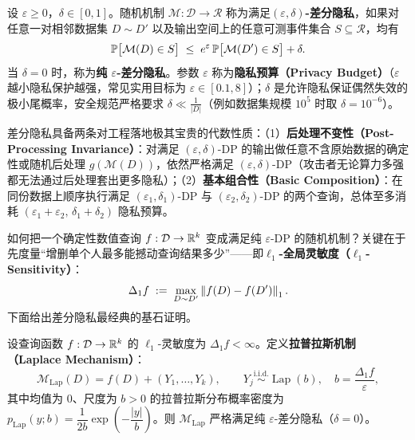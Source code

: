 \begin{defBox}
\begin{definition}\label{def:dp}
设 $\varepsilon \ge 0$，$\delta \in [0, 1]$。随机机制 $\mathcal{M}: \mathcal{D} \to \mathcal{R}$ 称为满足\textbf{$(\varepsilon, \delta)$-差分隐私}，如果对任意一对相邻数据集 $D \sim D'$ 以及输出空间上的任意可测事件集合 $S \subseteq \mathcal{R}$，均有
\begin{equation}\label{eq:dp-def}
  \mathbb{P}\big[\mathcal{M}(D) \in S\big]
  \;\le\; e^{\varepsilon}\,\mathbb{P}\big[\mathcal{M}(D') \in S\big] + \delta.
\end{equation}
当 $\delta = 0$ 时，称为\textbf{纯 $\varepsilon$-差分隐私}。参数 $\varepsilon$ 称为\textbf{隐私预算（Privacy Budget）}（$\varepsilon$ 越小隐私保护越强，常见实用目标为 $\varepsilon \in [0.1, 8]$）；$\delta$ 是允许隐私保证偶然失效的极小尾概率，安全规范严格要求 $\delta \ll \frac{1}{|D|}$（例如数据集规模 $10^5$ 时取 $\delta = 10^{-6}$）。
\end{definition}
\end{defBox}

差分隐私具备两条对工程落地极其宝贵的代数性质：（1）\textbf{后处理不变性（Post-Processing Invariance）}：对满足 $(\varepsilon,\delta)$-DP 的输出做任意不含原始数据的确定性或随机后处理 $g(\mathcal{M}(D))$，依然严格满足 $(\varepsilon,\delta)$-DP（攻击者无论算力多强都无法通过后处理套出更多隐私）；（2）\textbf{基本组合性（Basic Composition）}：在同份数据上顺序执行满足 $(\varepsilon_1,\delta_1)$-DP 与 $(\varepsilon_2,\delta_2)$-DP 的两个查询，总体至多消耗 $(\varepsilon_1+\varepsilon_2,\, \delta_1+\delta_2)$ 隐私预算。

如何把一个确定性数值查询 $f: \mathcal{D} \to \mathbb{R}^k$ 变成满足纯 $\varepsilon$-DP 的随机机制？关键在于先度量“增删单个人最多能撼动查询结果多少”——即\textbf{$\ell_1$-全局灵敏度（$\ell_1$-Sensitivity）}：
\[
  \Delta_1 f \;:=\; \max_{D \sim D'} \left\|f(D) - f(D')\right\|_1.
\]
下面给出差分隐私最经典的基石证明。

\begin{thmBox}
\begin{theorem}\label{thm:laplace-dp}
设查询函数 $f: \mathcal{D} \to \mathbb{R}^k$ 的 $\ell_1$-灵敏度为 $\Delta_1 f < \infty$。定义\textbf{拉普拉斯机制（Laplace Mechanism）}：
\begin{equation}\label{eq:laplace-mech}
  \mathcal{M}_{\mathrm{Lap}}(D) = f(D) + (Y_1, \dots, Y_k),
  \qquad Y_j \stackrel{\text{i.i.d.}}{\sim} \operatorname{Lap}\!\left(b\right),\quad b = \frac{\Delta_1 f}{\varepsilon},
\end{equation}
其中均值为 $0$、尺度为 $b > 0$ 的拉普拉斯分布概率密度为 $p_{\mathrm{Lap}}(y; b) = \dfrac{1}{2b}\exp\!\left(-\dfrac{|y|}{b}\right)$。则 $\mathcal{M}_{\mathrm{Lap}}$ 严格满足纯 $\varepsilon$-差分隐私（$\delta = 0$）。
\end{theorem}
\end{thmBox}


